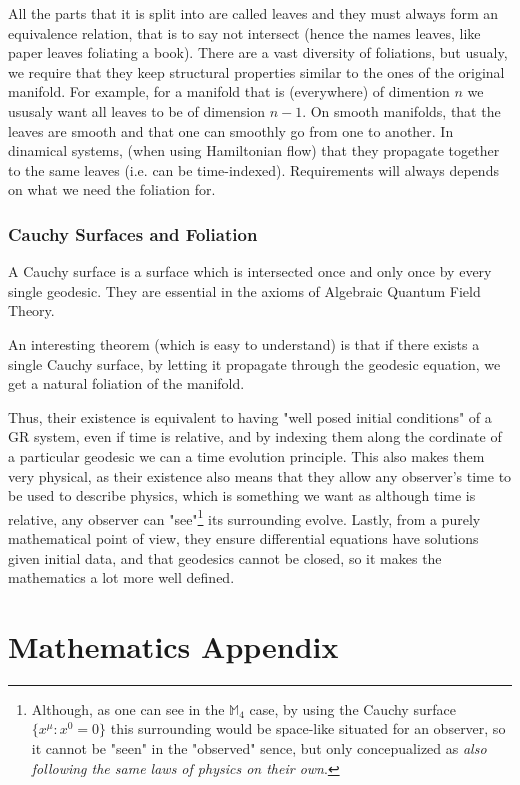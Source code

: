 \documentclass[a4paper,11pt]{article}
\numberwithin{equation}{section}
\theoremstyle{definition}
\begin{document}
    All the parts that it is split into are called leaves and they must always form an equivalence relation, that is to say not intersect (hence the names leaves, like paper leaves foliating a book). There are a vast diversity of foliations, but usualy, we require that they keep structural properties similar to the ones of the original manifold. For example, for a manifold that is (everywhere) of dimention $n$ we ususaly want all leaves to be of dimension $n-1$. On smooth manifolds, that the leaves are smooth and that one can smoothly go from one to another. In dinamical systems, (when using Hamiltonian flow) that they propagate together to the same leaves (i.e. can be time-indexed). Requirements will always depends on what we need the foliation for.

\subsubsection{Cauchy Surfaces and Foliation}\label{CauchyPhy}
    A Cauchy surface is a surface which is intersected once and only once by every single geodesic. They are essential in the axioms of Algebraic Quantum Field Theory.

    An interesting theorem (which is easy to understand) is that if there exists a single Cauchy surface, by letting it propagate through the geodesic equation, we get a natural foliation of the manifold.

    Thus, their existence is equivalent to having "well posed initial conditions" of a GR system, even if time is relative, and by indexing them along the cordinate of a particular geodesic we can a time evolution principle.
    This also makes them very physical, as their existence also means that they allow any observer's time to be used to describe physics, which is something we want as although time is relative, any observer can "see"\footnote{Although, as one can see in the $\mathbb{M}_4$ case, by using the Cauchy surface $\{x^\mu : x^0= 0\}$ this surrounding would be space-like situated for an observer, so it cannot be "seen" in the "observed" sence, but only concepualized as \emph{also following the same laws of physics on their own}.} its surrounding evolve.
    Lastly, from a purely mathematical point of view, they ensure differential equations have solutions given initial data, and that geodesics cannot be closed, so it makes the mathematics a lot more well defined.
    
\newpage
\section{Mathematics Appendix}
\end{document}
